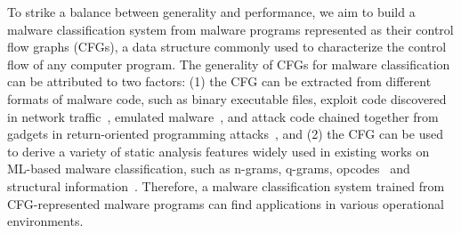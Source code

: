 To strike a balance between generality and performance, we aim to build a malware classification system from malware programs represented as their control flow graphs (CFGs), a data structure commonly used to characterize the control flow of any computer program.
The generality of CFGs for malware classification can be attributed to two factors:
(1) the CFG can be extracted from different formats of malware code, such as binary executable files, exploit code discovered in network traffic~\cite{zhang2007analyzing}, emulated malware~\cite{sharif2009automatic},
and attack code chained together from gadgets in return-oriented programming attacks~\cite{shacham2007geometry},
and (2) the CFG can be used to derive a variety of static analysis features widely used in existing works on ML-based malware classification,
such as n-grams\cite{NgramMalwareDetect}, q-grams\cite{QgramMalwareDetect}, opcodes~\cite{bilar2007opcodes} and structural information~\cite{kong2013discriminant}.
Therefore, a malware classification system trained from CFG-represented malware programs can find applications in various operational environments.



